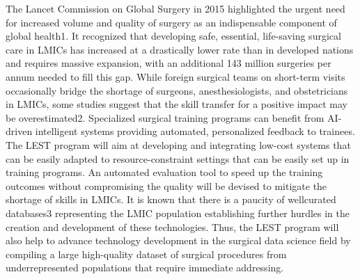 The Lancet Commission on Global Surgery in 2015 highlighted the urgent need for increased volume and quality of surgery as an indispensable component of global health1. It recognized that developing safe, essential, life-saving surgical care in LMICs has increased at a drastically lower rate than in developed nations and requires massive expansion, with an additional 143 million surgeries per annum needed to fill this gap. While foreign surgical teams on short-term visits occasionally bridge the shortage of surgeons, anesthesiologists, and obstetricians in LMICs, some studies suggest that the skill transfer for a positive impact may be overestimated2. Specialized surgical training programs can benefit from AI-driven intelligent systems providing automated, personalized feedback to trainees. The LEST program will aim at developing and integrating low-cost systems that can be easily adapted to resource-constraint settings that can be easily set up in training programs. An automated evaluation tool to speed up the training outcomes without compromising the quality will be devised to mitigate the shortage of skills in LMICs. It is known that there is a paucity of wellcurated databases3 representing the LMIC population establishing further hurdles in the creation and development of these technologies. Thus, the LEST program will also help to advance technology development in the surgical data science field by compiling a large high-quality dataset of surgical procedures from underrepresented populations that require immediate addressing.


